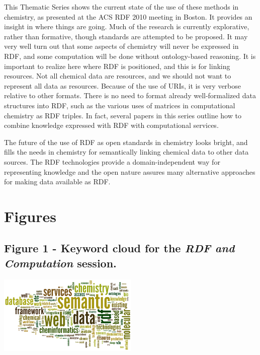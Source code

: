 \documentclass[10pt]{bmc_article}
\newenvironment{bmcformat}{\begin{raggedright}\baselineskip20pt\sloppy\setboolean{publ}{false}}{\end{raggedright}\baselineskip20pt\sloppy}
\begin{document}
\begin{bmcformat}
This Thematic Series shows the current state of the use of these methods in
chemistry, as presented at the ACS RDF 2010 meeting in Boston. It provides an
insight in where things are going. Much of the research is currently explorative,
rather than formative, though standards are attempted to be proposed. 
It may very well turn out that some aspects of chemistry will never be expressed
in RDF, and some computation will be done without ontology-based reasoning. It is important
to realize here where RDF is positioned, and this is for linking resources.
Not all chemical data are resources, and we should not want to represent
all data as resources.
Because of the use of URIs, it is very verbose relative to other formats.
There is no need to format already well-formalized data structures into
RDF, such as the various uses of matrices in computational chemistry as
RDF triples. In fact, several papers in this series outline how to
combine knowledge expressed with RDF with computational services.

The future of the use of RDF as open standards in chemistry looks
bright, and fills the needs in chemistry for semantically linking
chemical data to other data sources. The RDF technologies provide a
domain-independent way for representing knowledge and the open
nature assures many alternative approaches for making data available
as RDF.



{
   }     %



\clearpage

\section*{Figures}

  \subsection*{Figure 1 - Keyword cloud for the \textit{RDF and Computation} session.}
  \label{fig:wordle1}
  \includegraphics[width=0.5\textwidth]{graphics/wordle_cinf003} 


\end{bmcformat}
\end{document}
